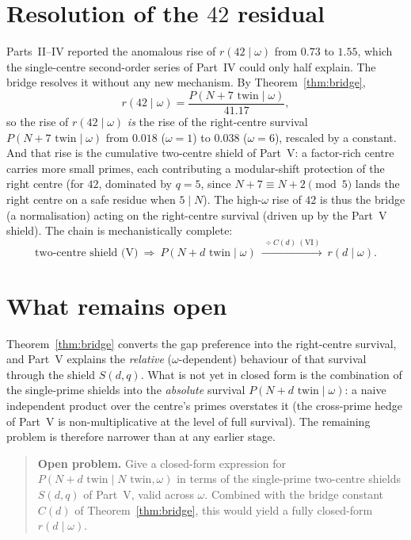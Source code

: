 \documentclass[11pt]{article}
\begin{document}
\section{Resolution of the $42$ residual}

Parts~II--IV reported the anomalous rise of $r(42\mid\omega)$ from $0.73$ to
$1.55$, which the single-centre second-order series of Part~IV could only half
explain. The bridge resolves it without any new mechanism. By
Theorem~\ref{thm:bridge},
\[
  r(42\mid\omega)=\frac{P(N{+}7\text{ twin}\mid\omega)}{41.17},
\]
so the rise of $r(42\mid\omega)$ \emph{is} the rise of the right-centre survival
$P(N{+}7\text{ twin}\mid\omega)$ from $0.018$ ($\omega{=}1$) to $0.038$
($\omega{=}6$), rescaled by a constant. And that rise is the cumulative
two-centre shield of Part~V: a factor-rich centre carries more small primes, each
contributing a modular-shift protection of the right centre (for $42$, dominated
by $q=5$, since $N{+}7\equiv N{+}2\pmod5$ lands the right centre on a safe
residue when $5\mid N$). The high-$\omega$ rise of $42$ is thus the bridge (a
normalisation) acting on the right-centre survival (driven up by the Part~V
shield). The chain is mechanistically complete:
\[
  \text{two-centre shield (V)}\ \Rightarrow\
  P(N{+}d\text{ twin}\mid\omega)\ \xrightarrow{\ \div C(d)\ (\text{VI})\ }\
  r(d\mid\omega).
\]

\section{What remains open}

Theorem~\ref{thm:bridge} converts the gap preference into the right-centre
survival, and Part~V explains the \emph{relative} ($\omega$-dependent) behaviour
of that survival through the shield $S(d,q)$. What is not yet in closed form is
the combination of the single-prime shields into the \emph{absolute} survival
$P(N{+}d\text{ twin}\mid\omega)$: a naive independent product over the centre's
primes overstates it (the cross-prime hedge of Part~V is non-multiplicative at
the level of full survival). The remaining problem is therefore narrower than at
any earlier stage.

\begin{quote}
\textbf{Open problem.} Give a closed-form expression for
$P(N{+}d\text{ twin}\mid N\text{ twin},\omega)$ in terms of the single-prime
two-centre shields $S(d,q)$ of Part~V, valid across $\omega$. Combined with the
bridge constant $C(d)$ of Theorem~\ref{thm:bridge}, this would yield a fully
closed-form $r(d\mid\omega)$.
\end{quote}
\end{document}

